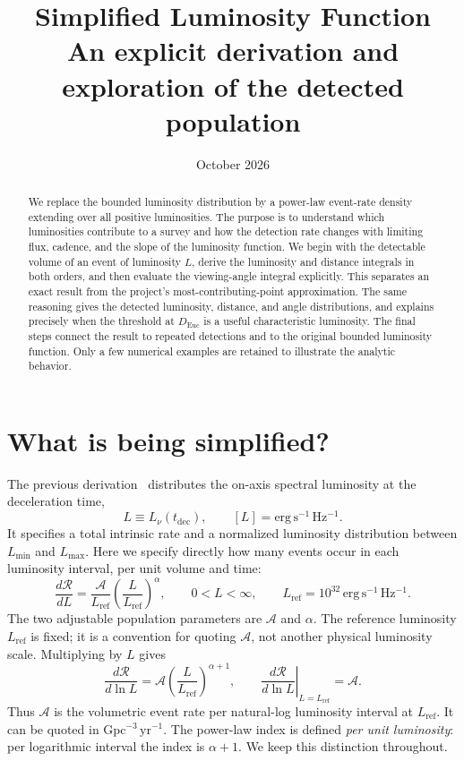 \documentclass[11pt,a4paper]{article}
\title{\textbf{Simplified Luminosity Function}\\[5pt]
\large An explicit derivation and exploration of the detected population}
\author{}
\date{October 2026}
\newcommand{\Euc}{\mathrm{Euc}}
\newcommand{\Lref}{L_{\mathrm{ref}}}
\newcommand{\tdec}{t_{\mathrm{dec}}}
\begin{document}
\maketitle

\begin{abstract}
We replace the bounded luminosity distribution by a power-law event-rate
density extending over all positive luminosities. The purpose is to understand
which luminosities contribute to a survey and how the detection rate changes
with limiting flux, cadence, and the slope of the luminosity function.
We begin with the detectable volume of an event of luminosity $L$, derive
the luminosity and distance integrals in both orders, and then evaluate the
viewing-angle integral explicitly. This separates an exact result from the
project's most-contributing-point approximation. The same reasoning gives the
detected luminosity, distance, and angle distributions, and explains precisely
when the threshold at $D_\Euc$ is a useful characteristic luminosity.
The final steps connect the result to repeated detections and to the original
bounded luminosity function. Only a few numerical examples are retained to
illustrate the analytic behavior.
\end{abstract}

\section{What is being simplified?}
\label{sec:population}
The previous derivation~\cite{PreviousLF} distributes the on-axis spectral luminosity at the
deceleration time,
\begin{equation}
 L\equiv L_\nu(\tdec),\qquad [L]=\mathrm{erg\,s^{-1}\,Hz^{-1}}.
 \label{eq:Ldefinition}
\end{equation}
It specifies a total intrinsic rate and a normalized luminosity distribution
between $L_{\min}$ and $L_{\max}$. Here we specify directly how many events
occur in each luminosity interval, per unit volume and time:
\begin{equation}
 \boxed{\frac{d\mathcal R}{dL}
 =\frac{\mathcal A}{\Lref}\left(\frac L{\Lref}\right)^\alpha,
 \qquad 0<L<\infty,\qquad
 \Lref=10^{32}\,\mathrm{erg\,s^{-1}\,Hz^{-1}}.}
 \label{eq:intensity}
\end{equation}
The two adjustable population parameters are $\mathcal A$ and $\alpha$.
The reference luminosity $\Lref$ is fixed; it is a convention for quoting
$\mathcal A$, not another physical luminosity scale. Multiplying by $L$ gives
\begin{equation}
 \frac{d\mathcal R}{d\ln L}
 =\mathcal A\left(\frac L{\Lref}\right)^{\alpha+1},
 \qquad
 \left.\frac{d\mathcal R}{d\ln L}\right|_{L=\Lref}=\mathcal A.
 \label{eq:logintensity}
\end{equation}
Thus $\mathcal A$ is the volumetric event rate per natural-log luminosity
interval at $\Lref$. It can be quoted in $\mathrm{Gpc^{-3}\,yr^{-1}}$.
The power-law index is defined \emph{per unit luminosity}: per logarithmic
interval the index is $\alpha+1$. We keep this distinction throughout.
\end{document}
